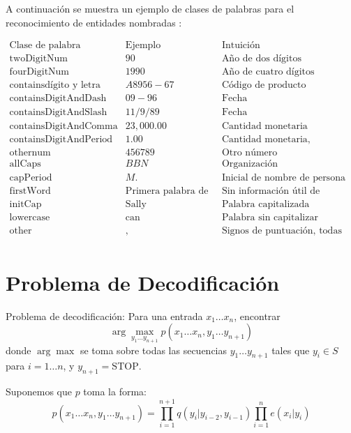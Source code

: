 A continuación se muestra un ejemplo de clases de palabras para el reconocimiento de entidades nombradas \cite{bikelSW99}:

\[
\begin{array}{l|l|l}
  \text{Clase de palabra} & \text{Ejemplo}  & \text{Intuición} \\
  \hline
  \text{twoDigitNum} & 90 & \text{Año de dos dígitos} \\
  \text{fourDigitNum} & 1990 & \text{Año de cuatro dígitos} \\
  \text{containsdígito y letra} & A8956-67 & \text{Código de producto} \\
  \text{containsDigitAndDash} & 09-96 & \text{Fecha} \\
  \text{containsDigitAndSlash} & 11/9/89 & \text{Fecha} \\
  \text{containsDigitAndComma} & 23,000.00 & \text{Cantidad monetaria} \\
  \text{containsDigitAndPeriod} & 1.00 & \text{Cantidad monetaria, porcentaje} \\
  \text{othernum} & 456789 & \text{Otro número} \\
  \text{allCaps} & BBN & \text{Organización} \\
  \text{capPeriod} & M. & \text{Inicial de nombre de persona} \\
  \text{firstWord} & \text{Primera palabra de la oración} & \text{Sin información útil de capitalización} \\
  \text{initCap} & \text{Sally} & \text{Palabra capitalizada} \\
  \text{lowercase} & \text{can} & \text{Palabra sin capitalizar} \\
  \text{other} & , & \text{Signos de puntuación, todas las demás palabras} \\
\end{array}
\]



\section{Problema de Decodificación}
Problema de decodificación: Para una entrada $x_1 \ldots x_n$, encontrar
\[
\arg \max_{y_1 \ldots y_{n+1}} p(x_1 \ldots x_n, y_1 \ldots y_{n+1})
\]
donde $\arg \max$ se toma sobre todas las secuencias $y_1 \ldots y_{n+1}$ tales que $y_i \in S$ para $i = 1 \ldots n$, y $y_{n+1} = \text{STOP}$.

Suponemos que $p$ toma la forma:
\[
p(x_1 \ldots x_n, y_1 \ldots y_{n+1}) = \prod_{i=1}^{n+1} q(y_i|y_{i-2}, y_{i-1}) \prod_{i=1}^{n} e(x_i|y_i)
\]


